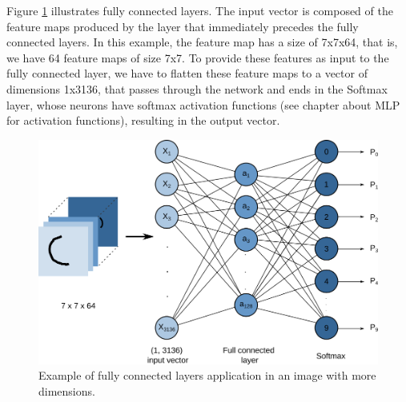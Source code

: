 Figure \ref{fig:figure124} illustrates fully connected layers. The input vector is composed of the feature maps produced by the layer that immediately precedes the fully connected layers. In this example, the feature map has a size of 7x7x64, that is, we have 64 feature maps of size 7x7. To provide these features as input to the fully connected layer, we have to flatten these feature maps to a vector of dimensions 1x3136, that passes through the network and ends in the Softmax layer, whose neurons have softmax activation functions (see chapter about MLP for activation functions), resulting in the output vector.

\begin{figure}[h]
    \centering
    \includegraphics[scale=0.50]{"Part 3 - Learning Systems/Supervised Learning/Deep Learning/images/figure124.png"}
    \caption{Example of fully connected layers application in an image with more dimensions.}
    \label{fig:figure124}
\end{figure}

